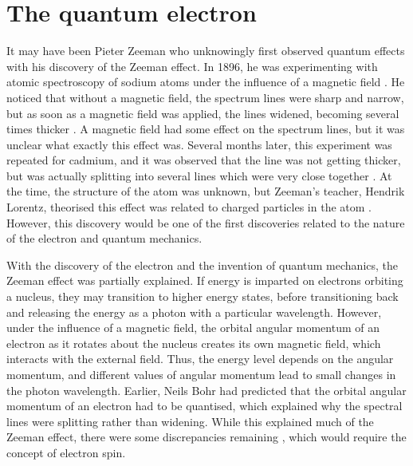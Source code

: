 \section*{The quantum electron}
It may have been Pieter Zeeman who unknowingly first observed quantum effects with his discovery of the Zeeman effect. In 1896, he was experimenting with atomic spectroscopy of sodium atoms under the influence of a magnetic field \cite{Kox1997}. He noticed that without a magnetic field, the spectrum lines were sharp and narrow, but as soon as a magnetic field was applied, the lines widened, becoming several times thicker \cite{Kox1997,Stoner1934,Mattis1981}. A magnetic field had some effect on the spectrum lines, but it was unclear what exactly this effect was. Several months later, this experiment was repeated for cadmium, and it was observed that the line was not getting thicker, but was actually splitting into several lines which were very close together \cite{Kox1997}. At the time, the structure of the atom was unknown, but Zeeman's teacher, Hendrik Lorentz, theorised this effect was related to charged particles in the atom \cite{Mattis1981,Kox1997}. However, this discovery would be one of the first discoveries related to the nature of the electron and quantum mechanics.

With the discovery of the electron and the invention of quantum mechanics, the Zeeman effect was partially explained. If energy is imparted on electrons orbiting a nucleus, they may transition to higher energy states, before transitioning back and releasing the energy as a photon with a particular wavelength. However, under the influence of a magnetic field, the orbital angular momentum of an electron as it rotates about the nucleus creates its own magnetic field, which interacts with the external field. Thus, the energy level depends on the angular momentum, and different values of angular momentum lead to small changes in the photon wavelength. Earlier, Neils Bohr had predicted that the orbital angular momentum of an electron had to be quantised, which explained why the spectral lines were splitting rather than widening. While this explained much of the Zeeman effect, there were some discrepancies remaining \cite{Mattis1981}, which would require the concept of electron spin.

